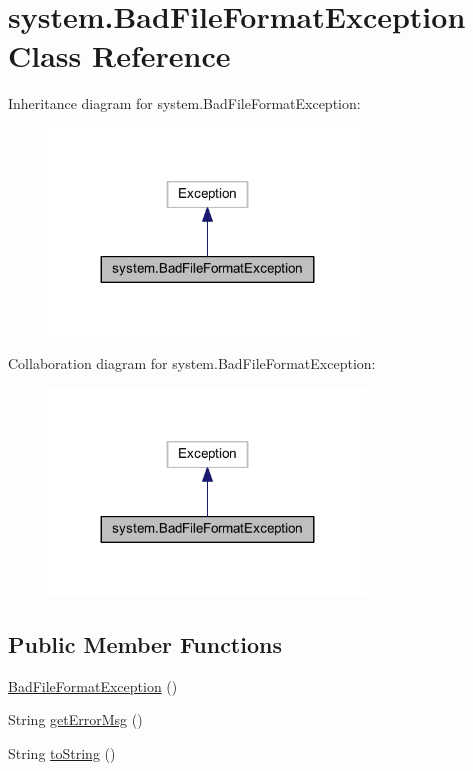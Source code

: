 \hypertarget{classsystem_1_1_bad_file_format_exception}{}\section{system.\+Bad\+File\+Format\+Exception Class Reference}
\label{classsystem_1_1_bad_file_format_exception}


Inheritance diagram for system.\+Bad\+File\+Format\+Exception\+:
\nopagebreak
\begin{figure}[H]
\begin{center}
\leavevmode
\includegraphics[width=239pt]{classsystem_1_1_bad_file_format_exception__inherit__graph}
\end{center}
\end{figure}


Collaboration diagram for system.\+Bad\+File\+Format\+Exception\+:
\nopagebreak
\begin{figure}[H]
\begin{center}
\leavevmode
\includegraphics[width=239pt]{classsystem_1_1_bad_file_format_exception__coll__graph}
\end{center}
\end{figure}
\subsection*{Public Member Functions}
\begin{DoxyCompactItemize}
\item 
\mbox{\hyperlink{classsystem_1_1_bad_file_format_exception_a7a5265f7672f98d9fd96ecd76d749401}{Bad\+File\+Format\+Exception}} ()
\item 
String \mbox{\hyperlink{classsystem_1_1_bad_file_format_exception_a1cb82d4aeefc2f29988b024f98ffb930}{get\+Error\+Msg}} ()
\item 
String \mbox{\hyperlink{classsystem_1_1_bad_file_format_exception_a76ab38238a81d1bfc6473cbee69c151f}{to\+String}} ()
\end{DoxyCompactItemize}
